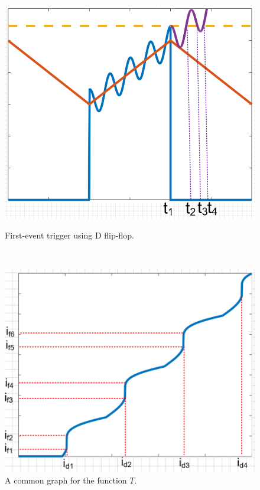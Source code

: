 \begin{figure}
\begin{minipage}{0.32\textwidth}
    \centering
    \includegraphics[width=\textwidth]{Figure/section2/Multievent_trigger.png}
    \caption{ \label{fig:multieventtrigger} First-event trigger using D flip-flop.}
\end{minipage}
~
\begin{minipage}{0.32\textwidth}
    \centering
    \includegraphics[width=\textwidth]{Figure/section2/functionT.png}
  \caption{  \label{fig:functionT} A common graph for the function $T$.}

\end{minipage}
\end{figure}
